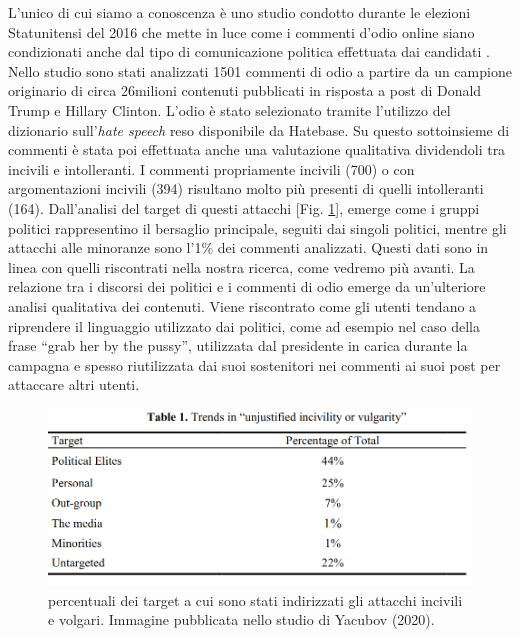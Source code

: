 L’unico di cui siamo a conoscenza è uno studio condotto durante le elezioni Statunitensi del 2016 che mette in luce come i commenti d'odio online siano condizionati anche dal tipo di comunicazione politica effettuata dai candidati \citep{yacubov2020}. Nello studio sono stati analizzati 1501 commenti di odio a partire da un campione originario di circa 26milioni  contenuti pubblicati in risposta a post di Donald Trump e Hillary Clinton. L'odio è stato selezionato tramite l'utilizzo del dizionario sull'\textit{hate speech} reso disponibile da Hatebase. Su questo sottoinsieme di commenti è stata poi effettuata anche una valutazione qualitativa dividendoli tra incivili e intolleranti. I commenti propriamente incivili (700) o con argomentazioni incivili (394) risultano molto più presenti di quelli intolleranti (164). Dall'analisi del target di questi attacchi [Fig. \ref{fig:hatetarget}], emerge come i gruppi politici rappresentino il bersaglio principale, seguiti dai singoli politici, mentre gli attacchi alle minoranze sono l'1\% dei commenti analizzati. Questi dati sono in linea con quelli riscontrati nella nostra ricerca, come vedremo più avanti.
La relazione tra i discorsi dei politici e i commenti di odio emerge da un'ulteriore analisi qualitativa dei contenuti. Viene riscontrato come gli utenti tendano a riprendere il linguaggio utilizzato dai politici, come ad esempio nel caso della frase “grab her by the pussy”, utilizzata dal presidente in carica durante la campagna e spesso riutilizzata dai suoi sostenitori nei commenti ai suoi post per attaccare altri utenti.
\begin{figure}
	\includegraphics[width=\textwidth]{figures/hatetarget}
	\caption{percentuali dei target a cui sono stati indirizzati gli attacchi incivili e volgari. Immagine pubblicata nello studio di Yacubov (2020).}
	\label{fig:hatetarget}
\end{figure}




